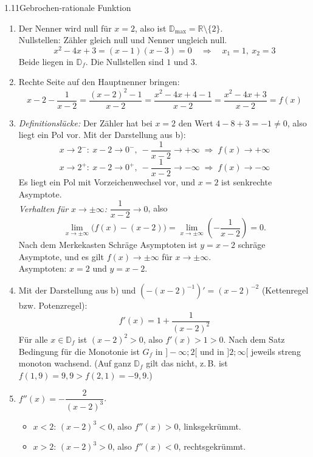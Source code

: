 \begin{loesung}{1.11}{Gebrochen-rationale Funktion}
\begin{enumerate}[label=\alph*)]
  \item Der Nenner wird null für $x=2$, also ist $\mathds{D}_{\text{max}} = \mathds{R}\setminus\{2\}$.\\
  Nullstellen: Zähler gleich null und Nenner ungleich null.
  \[x^2-4x+3 = (x-1)(x-3) = 0 \quad\Longrightarrow\quad x_1 = 1,\ x_2 = 3\]
  Beide liegen in $\mathds{D}_f$. Die Nullstellen sind $1$ und $3$.
  \item Rechte Seite auf den Hauptnenner bringen:
  \[x-2-\dfrac{1}{x-2} = \dfrac{(x-2)^2-1}{x-2} = \dfrac{x^2-4x+4-1}{x-2} = \dfrac{x^2-4x+3}{x-2} = f(x)\]
  \item \textit{Definitionslücke:} Der Zähler hat bei $x=2$ den Wert $4-8+3=-1\neq 0$, also liegt ein Pol vor. Mit der Darstellung aus b):
  \[x\longrightarrow 2^-:\ x-2\longrightarrow 0^-,\ -\dfrac{1}{x-2}\longrightarrow +\infty \;\Rightarrow\; f(x)\longrightarrow+\infty\]
  \[x\longrightarrow 2^+:\ x-2\longrightarrow 0^+,\ -\dfrac{1}{x-2}\longrightarrow -\infty \;\Rightarrow\; f(x)\longrightarrow-\infty\]
  Es liegt ein Pol mit Vorzeichenwechsel vor, und $x=2$ ist senkrechte Asymptote.\\
  \textit{Verhalten für $x\longrightarrow\pm\infty$:} $\dfrac{1}{x-2}\longrightarrow 0$, also
  \[\lim\limits_{x\longrightarrow\pm\infty}\big(f(x)-(x-2)\big) = \lim\limits_{x\longrightarrow\pm\infty}\left(-\dfrac{1}{x-2}\right) = 0.\]
  Nach dem Merkekasten \glqq Schräge Asymptoten\grqq{} ist $y=x-2$ schräge Asymptote, und es gilt $f(x)\longrightarrow\pm\infty$ für $x\longrightarrow\pm\infty$.\\
  Asymptoten: $x=2$ und $y=x-2$.
  \item Mit der Darstellung aus b) und $\left(-(x-2)^{-1}\right)' = (x-2)^{-2}$ (Kettenregel bzw. Potenzregel):
  \[f'(x) = 1+\dfrac{1}{(x-2)^2}\]
  Für alle $x\in\mathds{D}_f$ ist $(x-2)^2>0$, also $f'(x)>1>0$. Nach dem Satz \glqq Bedingung für die Monotonie\grqq{} ist $G_f$ in $]-\infty;2[$ und in $]2;\infty[$ jeweils streng monoton wachsend. (Auf ganz $\mathds{D}_f$ gilt das nicht, z.\,B. ist $f(1{,}9)=9{,}9 > f(2{,}1)=-9{,}9$.)
  \item $f''(x) = -\dfrac{2}{(x-2)^3}$.
  \begin{itemize}
    \item $x<2$: $(x-2)^3<0$, also $f''(x)>0$, linksgekrümmt.
    \item $x>2$: $(x-2)^3>0$, also $f''(x)<0$, rechtsgekrümmt.

\end{itemize}
\end{enumerate}
\end{loesung}
